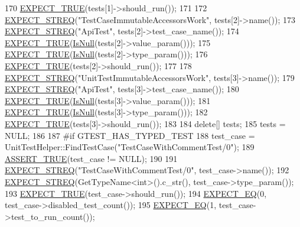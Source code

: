 \begin{DoxyCode}
170   \hyperlink{gtest_8h_ac33e7cdfb5d44a7a0f0ab552eb5c3c6a}{EXPECT\_TRUE}(tests[1]->should\_run());
171 
172   \hyperlink{gtest_8h_ad20f7b94ac5081e16f0005b94e95f0c6}{EXPECT\_STREQ}(\textcolor{stringliteral}{"TestCaseImmutableAccessorsWork"}, tests[2]->name());
173   \hyperlink{gtest_8h_ad20f7b94ac5081e16f0005b94e95f0c6}{EXPECT\_STREQ}(\textcolor{stringliteral}{"ApiTest"}, tests[2]->test\_case\_name());
174   \hyperlink{gtest_8h_ac33e7cdfb5d44a7a0f0ab552eb5c3c6a}{EXPECT\_TRUE}(\hyperlink{namespacetesting_1_1internal_adcfd37a66bc4cb0e8291cf46e1a6c72b}{IsNull}(tests[2]->value\_param()));
175   \hyperlink{gtest_8h_ac33e7cdfb5d44a7a0f0ab552eb5c3c6a}{EXPECT\_TRUE}(\hyperlink{namespacetesting_1_1internal_adcfd37a66bc4cb0e8291cf46e1a6c72b}{IsNull}(tests[2]->type\_param()));
176   \hyperlink{gtest_8h_ac33e7cdfb5d44a7a0f0ab552eb5c3c6a}{EXPECT\_TRUE}(tests[2]->should\_run());
177 
178   \hyperlink{gtest_8h_ad20f7b94ac5081e16f0005b94e95f0c6}{EXPECT\_STREQ}(\textcolor{stringliteral}{"UnitTestImmutableAccessorsWork"}, tests[3]->name());
179   \hyperlink{gtest_8h_ad20f7b94ac5081e16f0005b94e95f0c6}{EXPECT\_STREQ}(\textcolor{stringliteral}{"ApiTest"}, tests[3]->test\_case\_name());
180   \hyperlink{gtest_8h_ac33e7cdfb5d44a7a0f0ab552eb5c3c6a}{EXPECT\_TRUE}(\hyperlink{namespacetesting_1_1internal_adcfd37a66bc4cb0e8291cf46e1a6c72b}{IsNull}(tests[3]->value\_param()));
181   \hyperlink{gtest_8h_ac33e7cdfb5d44a7a0f0ab552eb5c3c6a}{EXPECT\_TRUE}(\hyperlink{namespacetesting_1_1internal_adcfd37a66bc4cb0e8291cf46e1a6c72b}{IsNull}(tests[3]->type\_param()));
182   \hyperlink{gtest_8h_ac33e7cdfb5d44a7a0f0ab552eb5c3c6a}{EXPECT\_TRUE}(tests[3]->should\_run());
183 
184   \textcolor{keyword}{delete}[] tests;
185   tests = NULL;
186 
187 \textcolor{preprocessor}{#if GTEST\_HAS\_TYPED\_TEST}
188   test\_case = UnitTestHelper::FindTestCase(\textcolor{stringliteral}{"TestCaseWithCommentTest/0"});
189   \hyperlink{gtest_8h_ae9244bfbda562e8b798789b001993fa5}{ASSERT\_TRUE}(test\_case != NULL);
190 
191   \hyperlink{gtest_8h_ad20f7b94ac5081e16f0005b94e95f0c6}{EXPECT\_STREQ}(\textcolor{stringliteral}{"TestCaseWithCommentTest/0"}, test\_case->name());
192   \hyperlink{gtest_8h_ad20f7b94ac5081e16f0005b94e95f0c6}{EXPECT\_STREQ}(GetTypeName<int>().c\_str(), test\_case->type\_param());
193   \hyperlink{gtest_8h_ac33e7cdfb5d44a7a0f0ab552eb5c3c6a}{EXPECT\_TRUE}(test\_case->should\_run());
194   \hyperlink{gtest_8h_a4159019abda84f5366acdb7604ff220a}{EXPECT\_EQ}(0, test\_case->disabled\_test\_count());
195   \hyperlink{gtest_8h_a4159019abda84f5366acdb7604ff220a}{EXPECT\_EQ}(1, test\_case->test\_to\_run\_count());

\end{DoxyCode}
